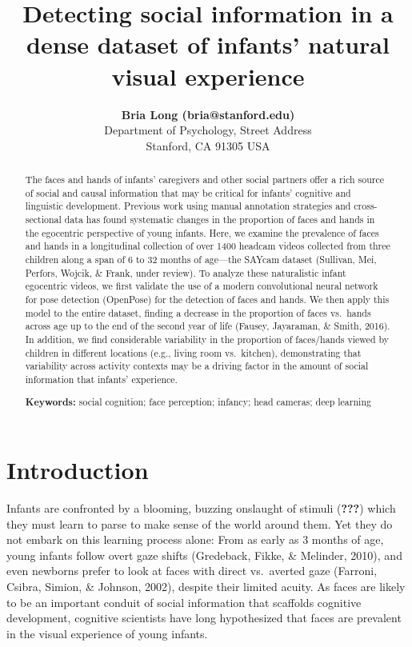 \documentclass[10pt, letterpaper]{article}
\title{Detecting social information in a dense dataset of infants' natural
visual experience}
\author{{\large \bf Bria Long (bria@stanford.edu)}  \AND {\large \bf George Kachergis (kachergis@stanford.edu)}  \AND {\large \bf Ketan Jay Agarwal (agrawalk@stanford.edu)}  \AND {\large \bf Michael C. Frank (mcfrank@stanford.edu)} \\  Department of Psychology, Street Address \\ Stanford, CA 91305 USA}
\begin{document}
\maketitle

\begin{abstract}
The faces and hands of infants' caregivers and other social partners
offer a rich source of social and causal information that may be
critical for infants' cognitive and linguistic development. Previous
work using manual annotation strategies and cross-sectional data has
found systematic changes in the proportion of faces and hands in the
egocentric perspective of young infants. Here, we examine the prevalence
of faces and hands in a longitudinal collection of over 1400 headcam
videos collected from three children along a span of 6 to 32 months of
age---the SAYcam dataset (Sullivan, Mei, Perfors, Wojcik, \& Frank,
under review). To analyze these naturalistic infant egocentric videos,
we first validate the use of a modern convolutional neural network for
pose detection (OpenPose) for the detection of faces and hands. We then
apply this model to the entire dataset, finding a decrease in the
proportion of faces vs.~hands across age up to the end of the second
year of life (Fausey, Jayaraman, \& Smith, 2016). In addition, we find
considerable variability in the proportion of faces/hands viewed by
children in different locations (e.g., living room vs.~kitchen),
demonstrating that variability across activity contexts may be a driving
factor in the amount of social information that infants' experience.

\textbf{Keywords:}
social cognition; face perception; infancy; head cameras; deep learning
\end{abstract}

\newcommand{\wrapmf}[1]{#1}





\section{Introduction}\label{introduction}

Infants are confronted by a blooming, buzzing onslaught of stimuli
({\textbf{???}}) which they must learn to parse to make sense of the
world around them. Yet they do not embark on this learning process
alone: From as early as 3 months of age, young infants follow overt gaze
shifts (Gredeback, Fikke, \& Melinder, 2010), and even newborns prefer
to look at faces with direct vs.~averted gaze (Farroni, Csibra, Simion,
\& Johnson, 2002), despite their limited acuity. As faces are likely to
be an important conduit of social information that scaffolds cognitive
development, cognitive scientists have long hypothesized that faces are
prevalent in the visual experience of young infants.
\end{document}
